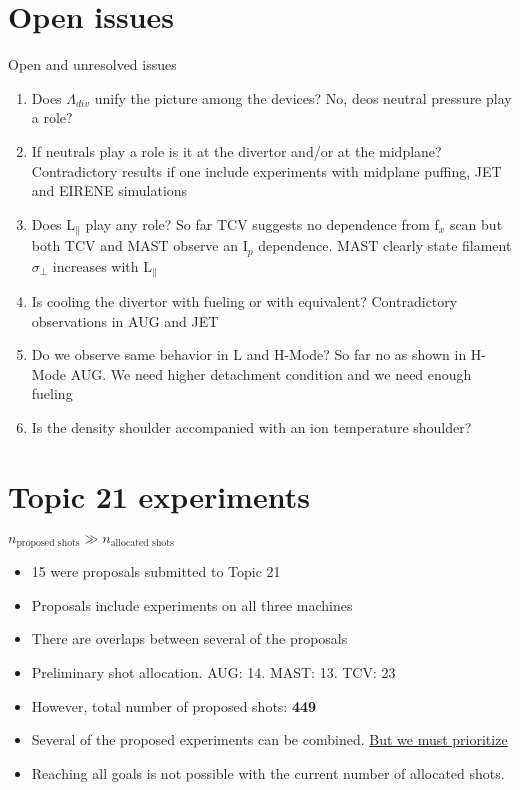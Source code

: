 \documentclass[10pt, compress]{beamer}
\begin{document}
  \section{Open issues}
  \begin{frame}{Open and unresolved issues}
  \begin{enumerate}[<+(1) | invisible@-+>]
    \item Does $\Lambda_{div}$ unify the picture among the devices?
      \alert{No, deos neutral pressure play a role?}
    \item If neutrals play a role is it at the divertor and/or at the midplane?
      \alert{Contradictory results if one include experiments with
        midplane puffing, JET and EIRENE simulations}
    \item Does L$_\parallel$ play any role? \alert{So far TCV suggests no
      dependence from f$_x$ scan but both TCV and MAST observe an
      I$_p$ dependence. MAST clearly state filament $\sigma_{\perp}$
      increases with L$_{\parallel}$ }
    \item Is cooling the divertor with fueling or with equivalent? \alert{Contradictory observations in AUG and JET}
    \item Do we observe same behavior in L and H-Mode? \alert{So
      far no as shown in H-Mode AUG. We need higher detachment
      condition and we need enough fueling}
      \item Is the density shoulder accompanied with an ion temperature shoulder?
    \end{enumerate}
  \end{frame}
  
\section{Topic 21 experiments }
\begin{frame}{$n_{\text{proposed shots}} \gg n_{\text{allocated shots}}$}
	\begin{itemize}
		\item 15 were proposals submitted to Topic 21
		\item Proposals include experiments on all three machines 
		\item There are overlaps between several of the proposals 
		\item Preliminary shot allocation. AUG: 14. MAST: 13. TCV: 23 
		\item However, total number of proposed shots:  \textbf{449}
		\item Several of the proposed experiments can be combined. \underline{But we must prioritize}
		\item Reaching all goals is not possible with the current number of allocated shots.
	\end{itemize}
\end{frame}
\end{document}
